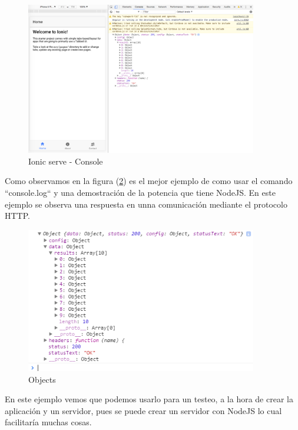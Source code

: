 \documentclass[a4paper, 11pt]{article}
\begin{document}
\begin{itemize}
             \begin{figure}[H]
               \centering
                    \includegraphics[width=0.9\textwidth]{console}
                    \caption{Ionic serve - Console}
                    \label{f:console}
              \end{figure}

              Como observamos en la figura (\ref{f:object}) es el mejor ejemplo
              de como usar el comando ``console.log`` y una demostración de la
              potencia que tiene NodeJS. En este ejemplo se observa una respuesta
              en unna comunicación mediante el protocolo HTTP.\\

              \begin{figure}[H]
                \centering
                     \includegraphics[width=0.9\textwidth]{objects}
                     \caption{Objects}
                     \label{f:object}
               \end{figure}

              En este ejemplo vemos que podemos usarlo para un testeo, a la hora
              de crear la aplicación y un servidor, pues se puede crear un servidor
              con NodeJS lo cual facilitaría muchas cosas.\\


\end{itemize}
\end{document}

